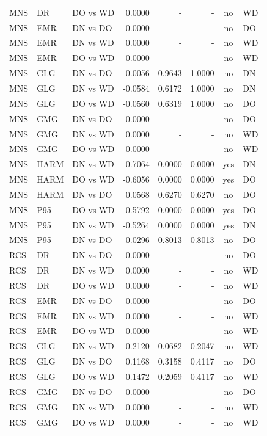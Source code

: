 \begin{center}
\begin{longtable}{p{1.0cm}p{1.0cm}p{1.8cm}r r r c p{1.0cm}}
MNS & DR & DO vs WD & 0.0000 & - & - & no & WD \\
MNS & EMR & DN vs DO & 0.0000 & - & - & no & DO \\
MNS & EMR & DN vs WD & 0.0000 & - & - & no & WD \\
MNS & EMR & DO vs WD & 0.0000 & - & - & no & WD \\
MNS & GLG & DN vs DO & -0.0056 & 0.9643 & 1.0000 & no & DN \\
MNS & GLG & DN vs WD & -0.0584 & 0.6172 & 1.0000 & no & DN \\
MNS & GLG & DO vs WD & -0.0560 & 0.6319 & 1.0000 & no & DO \\
MNS & GMG & DN vs DO & 0.0000 & - & - & no & DO \\
MNS & GMG & DN vs WD & 0.0000 & - & - & no & WD \\
MNS & GMG & DO vs WD & 0.0000 & - & - & no & WD \\
MNS & HARM & DN vs WD & -0.7064 & 0.0000 & 0.0000 & yes & DN \\
MNS & HARM & DO vs WD & -0.6056 & 0.0000 & 0.0000 & yes & DO \\
MNS & HARM & DN vs DO & 0.0568 & 0.6270 & 0.6270 & no & DO \\
MNS & P95 & DO vs WD & -0.5792 & 0.0000 & 0.0000 & yes & DO \\
MNS & P95 & DN vs WD & -0.5264 & 0.0000 & 0.0000 & yes & DN \\
MNS & P95 & DN vs DO & 0.0296 & 0.8013 & 0.8013 & no & DO \\
RCS & DR & DN vs DO & 0.0000 & - & - & no & DO \\
RCS & DR & DN vs WD & 0.0000 & - & - & no & WD \\
RCS & DR & DO vs WD & 0.0000 & - & - & no & WD \\
RCS & EMR & DN vs DO & 0.0000 & - & - & no & DO \\
RCS & EMR & DN vs WD & 0.0000 & - & - & no & WD \\
RCS & EMR & DO vs WD & 0.0000 & - & - & no & WD \\
RCS & GLG & DN vs WD & 0.2120 & 0.0682 & 0.2047 & no & WD \\
RCS & GLG & DN vs DO & 0.1168 & 0.3158 & 0.4117 & no & DO \\
RCS & GLG & DO vs WD & 0.1472 & 0.2059 & 0.4117 & no & WD \\
RCS & GMG & DN vs DO & 0.0000 & - & - & no & DO \\
RCS & GMG & DN vs WD & 0.0000 & - & - & no & WD \\
RCS & GMG & DO vs WD & 0.0000 & - & - & no & WD \\

\end{longtable}
\end{center}
